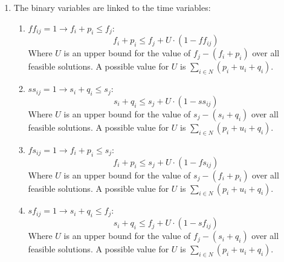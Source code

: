 \documentclass[a4paper,10pt]{article}
\begin{document}
\begin{enumerate}
    For each pair of patients \(i, j \in N\) with \(i < j\), we have four possible cases:
    \begin{enumerate}
      \item First visit to patient \(i\) ends before first visit to patient \(j\) starts:
      \item First visit to patient \(j\) ends before first visit to patient \(i\) starts:
      \item Second visit to patient \(i\) ends before second visit to patient \(j\) starts:
      \item Second visit to patient \(j\) ends before second visit to patient \(i\) starts:
    \end{enumerate}

    We will define four binary variables to represent these cases. See in the decision variables section.
    
    Therefore, we can express our constraints as:

    \[
      ff_{ij} + ff_{ji} = 1 \quad \forall i, j \in N, i < j
    \]
    \[
      ss_{ij} + ss_{ji} = 1 \quad \forall i, j \in N, i < j
    \]
    \[
      fs_{ij} + sf_{ji} = 1 \quad \forall i, j \in N, i \neq j
    \]

    \item The binary variables are linked to the time variables:
    \begin{enumerate}
      \item \(ff_{ij} = 1 \rightarrow f_i + p_i \leq f_j\):
      \[f_i + p_i \leq f_j + U \cdot (1 - ff_{ij})\]
      Where \(U\) is an upper bound for the value of \(f_j - (f_i + p_i)\) over all feasible solutions. A possible value for \(U\) is \(\sum_{i \in N} (p_i + u_i + q_i)\).

      \item \(ss_{ij} = 1 \rightarrow s_i + q_i \leq s_j\):
      \[s_i + q_i \leq s_j + U \cdot (1 - ss_{ij})\]
      Where \(U\) is an upper bound for the value of \(s_j - (s_i + q_i)\) over all feasible solutions. A possible value for \(U\) is \(\sum_{i \in N} (p_i + u_i + q_i)\).

      \item \(fs_{ij} = 1 \rightarrow f_i + p_i \leq s_j\):
      \[f_i + p_i \leq s_j + U \cdot (1 - fs_{ij})\]
      Where \(U\) is an upper bound for the value of \(s_j - (f_i + p_i)\) over all feasible solutions. A possible value for \(U\) is \(\sum_{i \in N} (p_i + u_i + q_i)\).

      \item \(sf_{ij} = 1 \rightarrow s_i + q_i \leq f_j\):
      \[s_i + q_i \leq f_j + U \cdot (1 - sf_{ij})\]
      Where \(U\) is an upper bound for the value of \(f_j - (s_i + q_i)\) over all feasible solutions. A possible value for \(U\) is \(\sum_{i \in N} (p_i + u_i + q_i)\).
    \end{enumerate}
  
\end{enumerate}
\end{document}
